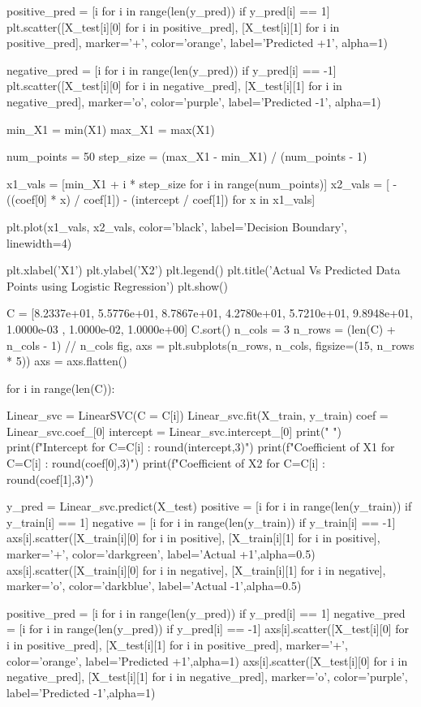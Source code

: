 \documentclass{article}
\begin{document}
\begin{python}
positive_pred = [i for i in range(len(y_pred)) if y_pred[i] == 1]
plt.scatter([X_test[i][0] for i in positive_pred], [X_test[i][1] for i in positive_pred], marker='+', color='orange', label='Predicted +1', alpha=1)

negative_pred = [i for i in range(len(y_pred)) if y_pred[i] == -1]
plt.scatter([X_test[i][0] for i in negative_pred], [X_test[i][1] for i in negative_pred], marker='o', color='purple', label='Predicted -1', alpha=1)


min_X1 = min(X1)
max_X1 = max(X1)

num_points = 50
step_size = (max_X1 - min_X1) / (num_points - 1)

x1_vals = [min_X1 + i * step_size for i in range(num_points)]
x2_vals = [ -((coef[0] * x) / coef[1]) - (intercept / coef[1]) for x in x1_vals]

plt.plot(x1_vals, x2_vals, color='black', label='Decision Boundary', linewidth=4)

plt.xlabel('X1')
plt.ylabel('X2')
plt.legend()
plt.title('Actual Vs Predicted Data Points using Logistic Regression')
plt.show()

C = [8.2337e+01, 5.5776e+01, 8.7867e+01, 4.2780e+01, 5.7210e+01, 9.8948e+01, 1.0000e-03 , 1.0000e-02, 1.0000e+00]
C.sort()
n_cols = 3
n_rows = (len(C) + n_cols - 1) // n_cols
fig, axs = plt.subplots(n_rows, n_cols, figsize=(15, n_rows * 5))
axs = axs.flatten()


for i in range(len(C)):
    
    Linear_svc = LinearSVC(C = C[i])
    Linear_svc.fit(X_train, y_train)
    coef = Linear_svc.coef_[0]
    intercept = Linear_svc.intercept_[0]
    print(" ")
    print(f"Intercept for C={C[i]} : {round(intercept,3)}")
    print(f"Coefficient of X1 for C={C[i]} : {round(coef[0],3)}")
    print(f"Coefficient of X2 for C={C[i]} : {round(coef[1],3)}")

    y_pred = Linear_svc.predict(X_test)
    positive = [i for i in range(len(y_train)) if y_train[i] == 1]
    negative = [i for i in range(len(y_train)) if y_train[i] == -1]
    axs[i].scatter([X_train[i][0] for i in positive], [X_train[i][1] for i in positive], 
                     marker='+', color='darkgreen', label='Actual +1',alpha=0.5)
    axs[i].scatter([X_train[i][0] for i in negative], [X_train[i][1] for i in negative], 
                     marker='o', color='darkblue', label='Actual -1',alpha=0.5)

    positive_pred = [i for i in range(len(y_pred)) if y_pred[i] == 1]
    negative_pred = [i for i in range(len(y_pred)) if y_pred[i] == -1]
    axs[i].scatter([X_test[i][0] for i in positive_pred], [X_test[i][1] for i in positive_pred], 
                     marker='+', color='orange', label='Predicted +1',alpha=1)
    axs[i].scatter([X_test[i][0] for i in negative_pred], [X_test[i][1] for i in negative_pred], 
                     marker='o', color='purple', label='Predicted -1',alpha=1)



\end{python}
\end{document}
